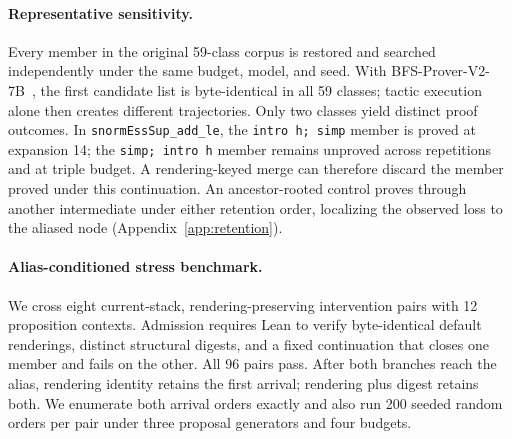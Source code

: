 \documentclass[11pt]{article}
\begin{document}
\begin{table}[t]\centering\small
\setlength{\tabcolsep}{3.2pt}
\caption{Exact uniform-order results on 96 admitted stress pairs. Loss is
conditioned on the refined arm exposing a proof within budget. For the targeted
generator, the pair-clustered 95\% bootstrap interval is 46.4--50.0\%; the
eight-base-template interval is 46.9--49.5\%.}
\label{tab:search}
\end{table}

\paragraph{Representative sensitivity.}
\label{sec:repsens}
Every member in the original 59-class corpus is restored and searched
independently under the same budget, model, and seed. With
BFS-Prover-V2-7B~\cite{xin2025bfsproverv2}, the first
candidate list is byte-identical in all 59 classes; tactic execution alone
then creates different trajectories. Only two classes yield distinct proof
outcomes. In \texttt{snormEssSup\_add\_le}, the \texttt{intro h; simp} member is
proved at expansion 14; the \texttt{simp; intro h} member remains unproved
across repetitions and at triple budget. A rendering-keyed merge can therefore
discard the member proved under this continuation. An ancestor-rooted control
proves through another intermediate under either retention order, localizing
the observed loss to the aliased node (Appendix~\ref{app:retention}).

\paragraph{Alias-conditioned stress benchmark.}
\label{sec:stress}
We cross eight current-stack, rendering-preserving intervention pairs with 12
proposition contexts. Admission requires Lean to verify byte-identical default
renderings, distinct structural digests, and a fixed continuation that closes
one member and fails on the other. All 96 pairs pass. After both branches reach
the alias, rendering identity retains the first arrival; rendering plus digest
retains both. We enumerate both arrival orders exactly and also run 200 seeded
random orders per pair under three proposal generators and four budgets.
\end{document}
